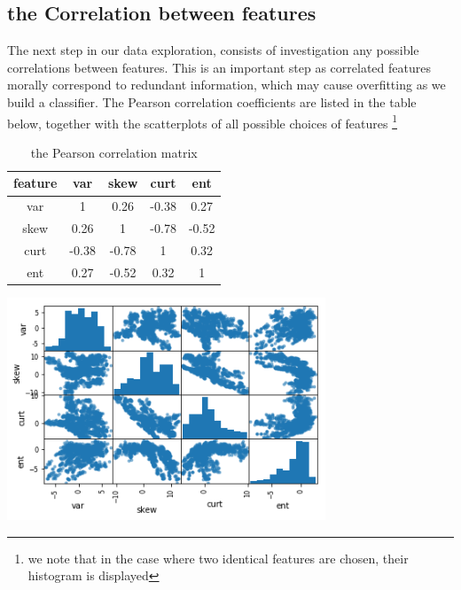 \documentclass[14pt]{article}
\theoremstyle{plain}
\theoremstyle{definition}
\begin{document}
\subsection{the Correlation between features} The next step in our data exploration, consists of investigation any possible correlations between features. This is an important step as correlated features morally correspond to redundant information, which may cause overfitting as we build a classifier. The Pearson correlation coefficients are listed in the table below, together with the scatterplots of all possible choices of features \footnote{we note that in the case where two identical features are chosen, their histogram is displayed}
\begin{table}[ht]
\begin{minipage}[b]{0.4\linewidth}
\centering
\begin{tabular}{|c |c| c| c |c |}
\hline
feature  &         var   &   skew &     curt    &   ent\\
  \hline
var &   1 & 0.26 & -0.38 & 0.27\\
\hline
skew & 0.26 & 1 & -0.78 & -0.52\\
\hline
curt & -0.38 & -0.78 &  1  & 0.32\\
\hline
ent   & 0.27 & -0.52 &  0.32 &  1\\
\hline
\end{tabular}
\vspace{0.83in}
 \caption{the Pearson correlation matrix}
    \label{table:student}
\end{minipage}
\begin{minipage}[b]{0.445\linewidth}
\centering
\includegraphics[width=95mm]{banknote_forgery_files/banknote_forgery_15_1}
\label{boxplot}
\end{minipage}
\end{table}
\end{document}
